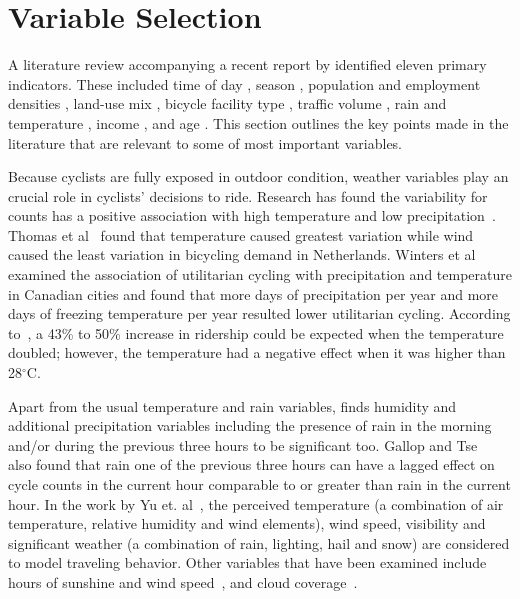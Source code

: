 \documentclass [11pt, proquest] {uwthesis}[2015/03/03]
\begin{document}
\section{Variable Selection}

A literature review accompanying a recent report by \cite{Bassok:2011aa} identified eleven primary indicators. These included 
time of day \cite{Schwartz:1999aa}, season \cite{Niemeier:1996aa}, population and employment densities \cite{McCahil:2008aa,Pinjari:2009aa}, land-use mix \cite{Pinjari:2009aa}, bicycle facility type \cite{Hunt:2007aa}, traffic volume \cite{McDonald:2007aa}, rain and temperature \cite{Niemeier:1996aa,Parkin:2008aa}, income \cite{Turner:1998aa}, and age \cite{Hunt:2007aa}. This section outlines the key points made in the literature that are relevant to some of most important variables. 

Because cyclists are fully exposed in outdoor condition, weather variables play an crucial role in cyclists' decisions to ride. Research has found the variability for counts has a positive association with high temperature and low precipitation~\cite{Niemeier:1996aa,Parkin:2008aa}. Thomas et al~\cite{Thomas:2009aa} found that temperature caused greatest variation while wind caused the least variation in bicycling demand in Netherlands. Winters et al~\cite{Winters07} examined the association of utilitarian cycling with precipitation and temperature in Canadian cities and found that more days of precipitation per year and more days of freezing temperature per year resulted lower utilitarian cycling. According to~\cite{Miranda-Moreno:2011aa}, a 43\% to 50\% increase in ridership could be expected when the temperature doubled; however, the temperature had a negative effect when it was higher than 28$^\circ$C.

Apart from the usual temperature and rain variables, \cite{Miranda-Moreno:2011aa} finds humidity and additional precipitation variables including the presence of rain in the morning and/or during the previous three hours to be significant too. Gallop and Tse~\cite{Gallop:2012aa} also found that rain one of the previous three hours can have a lagged effect on cycle counts in the current hour comparable to or greater than rain in the current hour. In the work by Yu et. al~\cite{Yu09}, the perceived temperature (a combination of air temperature, relative humidity and wind elements), wind speed, visibility and significant weather (a combination of rain, lighting, hail and snow) are considered to model traveling behavior. Other variables that have been examined include hours of sunshine and wind speed~\cite{Thomas12}, and cloud coverage~\cite{Hanson77}.
\end{document}
